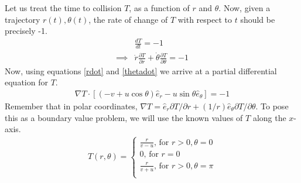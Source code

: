 \documentclass{article}
\begin{document}
Let us treat the time to collision $T$,
as a function of $r$ and $\theta$.
Now,
given a trajectory $r(t), \theta(t)$,
the rate of change of $T$ with respect to $t$
should be precisely -1.
\begin{align*}
	& \frac{dT}{dt} = -1 \\
	\implies & \dot{r} \frac{\partial T}{\partial r}
		+ \dot{\theta} \frac{\partial T}{\partial \theta} = -1
\end{align*}
Now, using equations \ref{rdot} and \ref{thetadot}
we arrive at a partial differential equation for $T$.
\begin{align}
	\nabla T \cdot [(-v + u \cos \theta) \hat{e}_r
		- u \sin \theta \hat{e}_{\theta}]  = -1 \label{pde}
\end{align}
Remember that in polar coordinates,
$\nabla T = \hat{e}_r \partial T / \partial r  + (1/r) \hat{e}_{\theta} \partial T / \partial \theta$.
To pose this as a boundary value problem,
we will use the known values of $T$ along the $x$-axis.
\begin{align}
	T(r,\theta) =
	\begin{cases}
		\frac{r}{v-u} \text{, for } r > 0, \theta = 0 \\
		0 \text{, for } r = 0 \\
		\frac{r}{v+u} \text{, for } r > 0, \theta = \pi \\
	\end{cases}
	\label{bvp}
\end{align}
\end{document}
